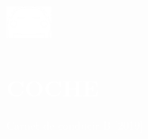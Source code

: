 \documentclass[../main.tex]{subfiles}
\begin{document}
\hspace*{0.2cm}
    \begin{minipage}[t]{2cm}
        \vspace*{0.9cm}\includegraphics[width=1.5cm]{assets/car.png}
    \end{minipage}
    \begin{minipage}[t]{5cm}
    
        \vspace*{0.75cm}
        \section*{\textcolor{white}{COCHE}}
        \vspace*{-0.25cm}
        \textcolor{white}{
            Carnet de conducir B [2019]
        }
    \end{minipage}
\end{document}
